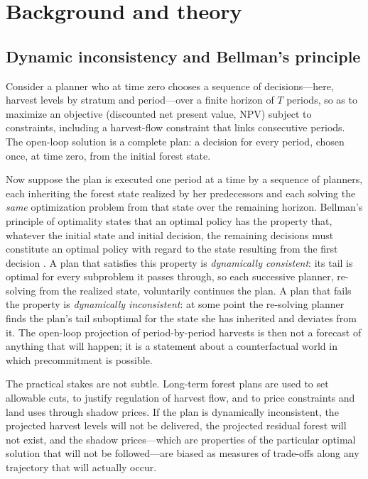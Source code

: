 \section{Background and theory}

\hypertarget{dynamic-inconsistency-and-bellmans-principle}{%
\subsection{Dynamic inconsistency and Bellman's principle}\label{dynamic-inconsistency-and-bellmans-principle}}

Consider a planner who at time zero chooses a sequence of decisions---here, harvest levels by stratum and period---over a finite horizon of \(T\) periods, so as to maximize an objective (discounted net present value, NPV) subject to constraints, including a harvest-flow constraint that links consecutive periods. The open-loop solution is a complete plan: a decision for every period, chosen once, at time zero, from the initial forest state.

Now suppose the plan is executed one period at a time by a sequence of planners, each inheriting the forest state realized by her predecessors and each solving the \emph{same} optimization problem from that state over the remaining horizon. Bellman's principle of optimality states that an optimal policy has the property that, whatever the initial state and initial decision, the remaining decisions must constitute an optimal policy with regard to the state resulting from the first decision \citep{bellman1957dynamic}. A plan that satisfies this property is \emph{dynamically consistent}: its tail is optimal for every subproblem it passes through, so each successive planner, re-solving from the realized state, voluntarily continues the plan. A plan that fails the property is \emph{dynamically inconsistent}: at some point the re-solving planner finds the plan's tail suboptimal for the state she has inherited and deviates from it. The open-loop projection of period-by-period harvests is then not a forecast of anything that will happen; it is a statement about a counterfactual world in which precommitment is possible.

The practical stakes are not subtle. Long-term forest plans are used to set allowable cuts, to justify regulation of harvest flow, and to price constraints and land uses through shadow prices. If the plan is dynamically inconsistent, the projected harvest levels will not be delivered, the projected residual forest will not exist, and the shadow prices---which are properties of the particular optimal solution that will not be followed---are biased as measures of trade-offs along any trajectory that will actually occur.

